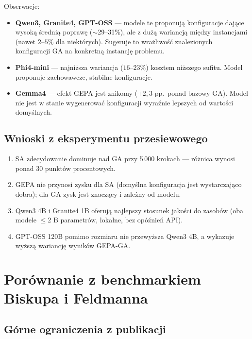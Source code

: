 \documentclass[11pt,a4paper]{article}
\begin{document}
Obserwacje:

\begin{itemize}
  \item \textbf{Qwen3, Granite4, GPT-OSS} — modele te proponują konfiguracje
        dające wysoką średnią poprawę ($\sim$29–31\%), ale z dużą wariancją
        między instancjami (nawet $2$–$5\%$ dla niektórych).
        Sugeruje to wrażliwość znalezionych konfiguracji GA na konkretną
        instancję problemu.

  \item \textbf{Phi4-mini} — najniższa wariancja ($16$–$23\%$) kosztem
        niższego sufitu.  Model proponuje zachowawcze, stabilne konfiguracje.

  \item \textbf{Gemma4} — efekt GEPA jest znikomy ($+2{,}3$ pp.\ ponad
        bazowy GA).  Model nie jest w stanie wygenerować konfiguracji
        wyraźnie lepszych od wartości domyślnych.
\end{itemize}

\subsection{Wnioski z eksperymentu przesiewowego}

\begin{enumerate}[label=\arabic*.]
  \item SA zdecydowanie dominuje nad GA przy 5\,000 krokach —
        różnica wynosi ponad 30 punktów procentowych.
  \item GEPA nie przynosi zysku dla SA (domyślna konfiguracja jest
        wystarczająco dobra); dla GA zysk jest znaczący i zależny od modelu.
  \item Qwen3 4B i Granite4 1B oferują najlepszy stosunek jakości do
        zasobów (oba modele $\leq 2$ B parametrów, lokalne, bez opóźnień API).
  \item GPT-OSS 120B pomimo rozmiaru nie przewyższa Qwen3 4B, a wykazuje
        wyższą wariancję wyników GEPA-GA.
\end{enumerate}

\section{Porównanie z benchmarkiem Biskupa i Feldmanna}

\subsection{Górne ograniczenia z publikacji}
\end{document}
